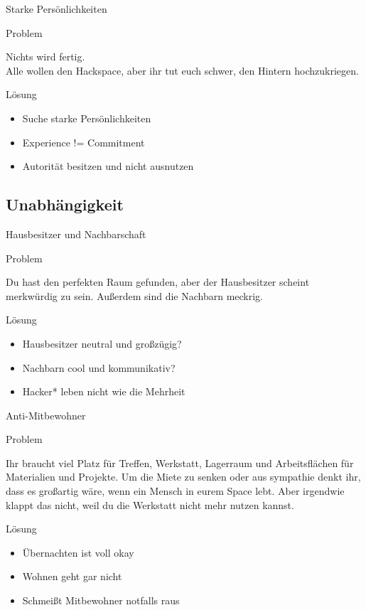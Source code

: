 \documentclass[aspectratio=43]{beamer}
\newcommand{\pattern}[2]{
  \begin{alertblock}{Problem}
    #1
  \end{alertblock}
  \pause
  \begin{exampleblock}{Lösung}
    #2
  \end{exampleblock}
}
\begin{document}
  \begin{frame}{Starke Persönlichkeiten}
    \pattern{
      Nichts wird fertig.\\
      Alle wollen den Hackspace, aber ihr tut euch schwer, den Hintern hochzukriegen.
    }{
      \begin{itemize}
        \item{Suche starke Persönlichkeiten}
        \pause
        \item{Experience != Commitment}
        \pause
        \item{Autorität besitzen und nicht ausnutzen}
      \end{itemize}
    }
  \end{frame}

  \subsection{Unabhängigkeit}

  \begin{frame}{Hausbesitzer und Nachbarschaft}
    \pattern{
      Du hast den perfekten Raum gefunden, aber der Hausbesitzer scheint
      merkwürdig zu sein. Außerdem sind die Nachbarn meckrig.
    }{
      \begin{itemize}
        \item{Hausbesitzer neutral und großzügig?}
        \pause
        \item{Nachbarn cool und kommunikativ?}
        \pause
        \item{Hacker* leben nicht wie die Mehrheit}
      \end{itemize}
    }
  \end{frame}

  \begin{frame}{Anti-Mitbewohner}
    \pattern{
      Ihr braucht viel Platz für Treffen, Werkstatt, Lagerraum und
      Arbeitsflächen für Materialien und Projekte. Um die Miete zu senken oder
      aus sympathie denkt ihr, dass es großartig wäre, wenn ein Mensch in eurem
      Space lebt. Aber irgendwie klappt das nicht, weil du die Werkstatt nicht
      mehr nutzen kannst.
    }{
      \begin{itemize}
        \item{Übernachten ist voll okay}
        \pause
        \item{Wohnen geht gar nicht}
        \pause
        \item{Schmeißt Mitbewohner notfalls raus}
      \end{itemize}
    }
  \end{frame}
\end{document}
